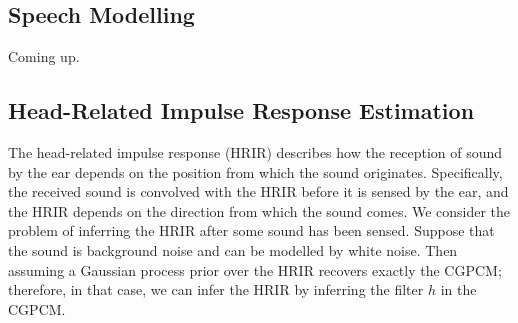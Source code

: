 \documentclass{article}
\newcommand{\cond}{\, | \,}               %
\begin{document}
\subsection{Speech Modelling}
Coming up.



\subsection{Head-Related Impulse Response Estimation}
The head-related impulse response (HRIR) describes how the reception of sound by the ear depends on the position from which the sound originates. Specifically, the received sound is convolved with the HRIR before it is sensed by the ear, and the HRIR depends on the direction from which the sound comes. We consider the problem of inferring the HRIR after some sound has been sensed. Suppose that the sound is background noise and can be modelled by white noise. Then assuming a Gaussian process prior over the HRIR recovers exactly the CGPCM; therefore, in that case, we can infer the HRIR by inferring the filter $h$ in the CGPCM.
\end{document}
